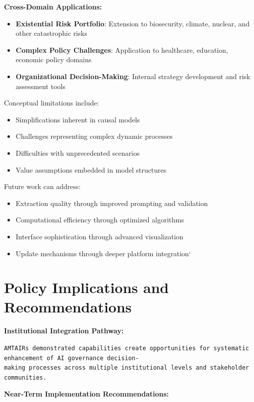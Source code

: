 \documentclass[
  11pt,
  letterpaper,
]{book}
\providecommand{\tightlist}{%
  \setlength{\itemsep}{0pt}\setlength{\parskip}{0pt}}
\begin{document}
\textbf{Cross-Domain Applications:}

\begin{itemize}
\tightlist
\item
  \textbf{Existential Risk Portfolio}: Extension to biosecurity,
  climate, nuclear, and other catastrophic risks
\item
  \textbf{Complex Policy Challenges}: Application to healthcare,
  education, economic policy domains
\item
  \textbf{Organizational Decision-Making}: Internal strategy development
  and risk assessment tools
\end{itemize}

Conceptual limitations include:

\begin{itemize}
\tightlist
\item
  Simplifications inherent in causal models
\item
  Challenges representing complex dynamic processes
\item
  Difficulties with unprecedented scenarios
\item
  Value assumptions embedded in model structures
\end{itemize}

Future work can address:

\begin{itemize}
\tightlist
\item
  Extraction quality through improved prompting and validation
\item
  Computational efficiency through optimized algorithms
\item
  Interface sophistication through advanced visualization
\item
  Update mechanisms through deeper platform integration`
\end{itemize}

\section{Policy Implications and
Recommendations}\label{sec-policy-implications}

\textbf{Institutional Integration Pathway:}

\texttt{AMTAIR\textquotesingle{}s\ demonstrated\ capabilities\ create\ opportunities\ for\ systematic\ enhancement\ of\ AI\ governance\ decision-making\ processes\ across\ multiple\ institutional\ levels\ and\ stakeholder\ communities.}

\textbf{Near-Term Implementation Recommendations:}
\end{document}
